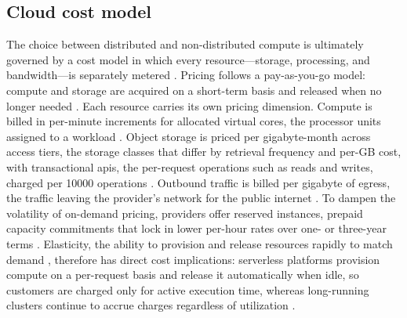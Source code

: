 \subsection{Cloud cost model}
\label{background:cloud-native-data-architecture:cloud-cost-model}
The choice between distributed and non-distributed compute is ultimately governed by a cost model in which every resource---storage, processing, and bandwidth---is separately metered \parencite{mell2011_nist_definition_of_cloud_computing}. Pricing follows a pay-as-you-go model: compute and storage are acquired on a short-term basis and released when no longer needed \parencite{armbrust2010_view_of_cloud_computing}. Each resource carries its own pricing dimension. Compute is billed in per-minute increments for allocated virtual cores, the processor units assigned to a workload \parencite{microsoft2024_virtual_machines_pricing}. Object storage is priced per gigabyte-month across access tiers, the storage classes that differ by retrieval frequency and per-GB cost, with transactional \acrshort{api}s, the per-request operations such as reads and writes, charged per \num{10000} operations \parencite{microsoft2024_azure_data_lake_storage_pricing}. Outbound traffic is billed per gigabyte of egress, the traffic leaving the provider's network for the public internet \parencite{microsoft2024_bandwidth_pricing}. To dampen the volatility of on-demand pricing, providers offer reserved instances, prepaid capacity commitments that lock in lower per-hour rates over one- or three-year terms \parencite{microsoft2024_azure_reservations}. Elasticity, the ability to provision and release resources rapidly to match demand \parencite{mell2011_nist_definition_of_cloud_computing}, therefore has direct cost implications: serverless platforms provision compute on a per-request basis and release it automatically when idle, so customers are charged only for active execution time, whereas long-running clusters continue to accrue charges regardless of utilization \parencite{jonas2019_berkeley_view_on_serverless_computing}.
